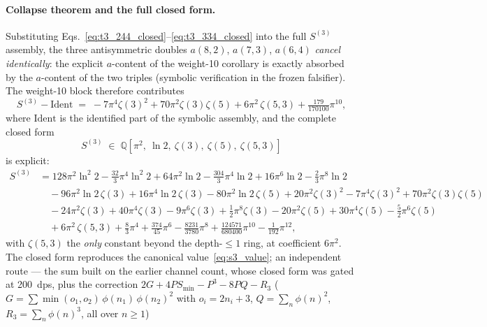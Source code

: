 \documentclass[11pt]{article}
\begin{document}
\paragraph{Collapse theorem and the full closed form.}
Substituting Eqs.~\eqref{eq:t3_244_closed}--\eqref{eq:t3_334_closed}
into the full $S^{(3)}$ assembly, the three antisymmetric doubles
$a(8,2)$, $a(7,3)$, $a(6,4)$ \emph{cancel identically}: the explicit
$a$-content of the weight-10 corollary is exactly absorbed by the
$a$-content of the two triples (symbolic verification in the frozen
falsifier).  The weight-10 block therefore contributes
\begin{equation}
  S^{(3)} - \mathrm{Ident} \;=\;
  -7\pi^4\zeta(3)^2 + 70\pi^2\zeta(3)\zeta(5)
  + 6\pi^2\,\zeta(5,3) + \tfrac{179}{170100}\pi^{10},
  \label{eq:s3_w10_contribution}
\end{equation}
where $\mathrm{Ident}$ is the identified part of the symbolic
assembly, and the complete closed form
\begin{equation}
  S^{(3)} \;\in\;
  \mathbb{Q}\!\left[\pi^2,\ \ln 2,\ \zeta(3),\ \zeta(5),\
  \zeta(5,3)\right]
  \label{eq:s3_ring}
\end{equation}
is explicit:
\begin{align}
  S^{(3)} &= 128\pi^2\ln^2 2 - \tfrac{32}{3}\pi^4\ln^2 2
   + 64\pi^2\ln 2 - \tfrac{304}{3}\pi^4\ln 2 + 16\pi^6\ln 2
   - \tfrac{2}{3}\pi^8\ln 2 \nonumber\\
  &\quad - 96\pi^2\ln 2\,\zeta(3) + 16\pi^4\ln 2\,\zeta(3)
   - 80\pi^2\ln 2\,\zeta(5)
   + 20\pi^2\zeta(3)^2 - 7\pi^4\zeta(3)^2 + 70\pi^2\zeta(3)\zeta(5)
   \nonumber\\
  &\quad - 24\pi^2\zeta(3) + 40\pi^4\zeta(3) - 9\pi^6\zeta(3)
   + \tfrac12\pi^8\zeta(3)
   - 20\pi^2\zeta(5) + 30\pi^4\zeta(5) - \tfrac52\pi^6\zeta(5)
   \nonumber\\
  &\quad + 6\pi^2\,\zeta(5,3)
   + \tfrac{8}{3}\pi^4 + \tfrac{374}{45}\pi^6 - \tfrac{8231}{3780}\pi^8
   + \tfrac{124571}{680400}\pi^{10} - \tfrac{1}{192}\pi^{12},
  \label{eq:s3_closed_form}
\end{align}
with $\zeta(5,3)$ the \emph{only} constant beyond the
depth-$\le 1$ ring, at coefficient $6\pi^2$.  The closed form
reproduces the canonical value~\eqref{eq:s3_value}; an independent
route --- the sum built on the earlier channel count, whose closed form
was gated at 200~dps, plus the correction
$2G + 4P S_{\min} - P^3 - 8PQ - R_3$
($G = \sum \min(o_1,o_2)\,\phi(n_1)\,\phi(n_2)^2$ with $o_i = 2n_i + 3$,
$Q = \sum_n \phi(n)^2$, $R_3 = \sum_n \phi(n)^3$, all over $n \ge 1$)
\end{document}
